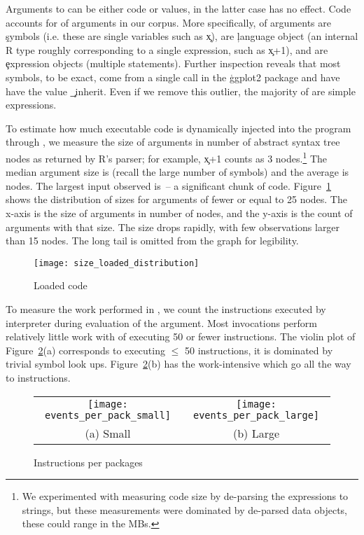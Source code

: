 \documentclass[acmsmall]{acmart}
\begin{document}
Arguments to \eval can be either code or values, in the latter case
\eval has no effect. Code accounts for \Codepercent of arguments in
our corpus. More specifically, \Symbolpercent of arguments are
\c{symbol}s (i.e. these are single variables such as \c{x}),
\Languagepercent are \c{language} object (an internal R type roughly
corresponding to a single expression, such as \c{x+1}), and
\Expressionpercent are \c{expression} objects (multiple statements).
Further inspection reveals that most symbols, \Ggplotsymbolpercent to
be exact, come from a single call in the \c{ggplot2} package and have
have the value \c{_inherit}. Even if we remove this outlier, the
majority of \evals are simple expressions.

To estimate how much executable code is dynamically injected into the
program through \eval, we measure the size of arguments in number of
abstract syntax tree nodes as returned by R's parser; for example,
\c{x+1} counts as 3 nodes.\footnote{We experimented with measuring
code size by de-parsing the expressions to strings, but these
measurements were dominated by de-parsed data objects, these could
range in the MBs.} The median argument size is \Medianszeval (recall
the large number of symbols) and the average is \Avgszeval nodes. The
largest \eval input observed is \Maxszeval\,-- a significant chunk of
code. Figure~\ref{fig:sizedistribution} shows the distribution of
sizes for arguments of fewer or equal to 25 nodes. The x-axis is the
size of arguments in number of nodes, and the y-axis is the count of
arguments with that size. The size drops rapidly, with few
observations larger than 15 nodes. The long tail is omitted from the
graph for legibility.

\begin{figure}[h!]
 \texttt{[image: size\_loaded\_distribution]}
\caption{Loaded code} \label{fig:sizedistribution}
\end{figure}

To measure the work performed in \evals, we count the instructions
executed by interpreter during evaluation of the argument.  Most invocations perform relatively little
work with \Smalleventspct of \evals executing 50 or fewer
instructions. The violin plot of Figure~\ref{ev}(a) corresponds to
\evals executing $\leq$ 50 instructions, it is dominated by trivial
symbol look ups. Figure~\ref{ev}(b) has the work-intensive \evals
which go all the way to \MaxeventsRnd instructions.

\begin{figure}[h!]
\begin{tabular}{@{}c@{}c@{}}
\begin{minipage}{7.5cm}
 \texttt{[image: events\_per\_pack\_small]}
\end{minipage}&\begin{minipage}{7.5cm}
  \texttt{[image: events\_per\_pack\_large]}
\end{minipage}\\[-3mm]
\small (a) Small & \small (b) Large
\end{tabular}
 \caption{Instructions per packages} \label{ev}
\end{figure}
\end{document}
